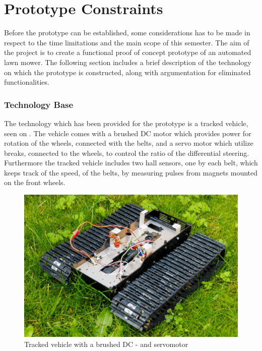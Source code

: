 \section{Prototype Constraints}
Before the prototype can be established, some considerations has to be made in respect to the time limitations and the main scope of this semester. The aim of the project is to create a functional proof of concept prototype of an automated lawn mower. The following section includes a brief description of the technology on which the prototype is constructed, along with argumentation for eliminated functionalities.

\subsubsection{Technology Base}
The technology which has been provided for the prototype is a tracked vehicle, seen on . The vehicle comes with a brushed DC motor which provides power for rotation of the wheels, connected with the belts, and a servo motor which utilize breaks, connected to the wheels, to control the ratio of the differential steering. Furthermore the tracked vehicle includes two hall sensors, one by each belt, which keeps track of the speed, of the belts, by measuring pulses from magnets mounted on the front wheels.


\begin{figure}[H]
	\centering
	\includegraphics[scale=0.1]{figures/BeltVehicle.jpg}
	\flushleft
	\caption{Tracked vehicle with a brushed DC - and servomotor}
	\label{TrackedVehicle}
\end{figure}

